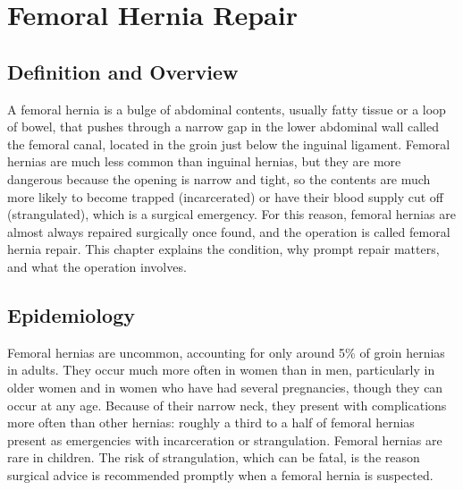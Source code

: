 \chapter{Femoral Hernia Repair}

\section*{Definition and Overview}
A femoral hernia is a bulge of abdominal contents, usually fatty tissue or a loop of bowel, that pushes through a narrow gap in the lower abdominal wall called the femoral canal, located in the groin just below the inguinal ligament. Femoral hernias are much less common than inguinal hernias, but they are more dangerous because the opening is narrow and tight, so the contents are much more likely to become trapped (incarcerated) or have their blood supply cut off (strangulated), which is a surgical emergency. For this reason, femoral hernias are almost always repaired surgically once found, and the operation is called femoral hernia repair. This chapter explains the condition, why prompt repair matters, and what the operation involves.

\section*{Epidemiology}
Femoral hernias are uncommon, accounting for only around 5\% of groin hernias in adults. They occur much more often in women than in men, particularly in older women and in women who have had several pregnancies, though they can occur at any age. Because of their narrow neck, they present with complications more often than other hernias: roughly a third to a half of femoral hernias present as emergencies with incarceration or strangulation. Femoral hernias are rare in children. The risk of strangulation, which can be fatal, is the reason surgical advice is recommended promptly when a femoral hernia is suspected.

